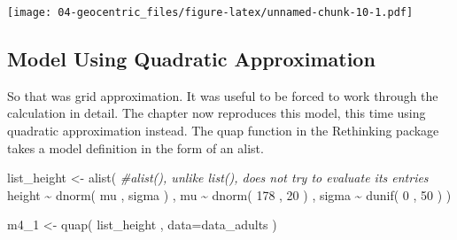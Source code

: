 \documentclass[
]{book}
\newenvironment{Shaded}{\begin{snugshade}}{\end{snugshade}}
\newcommand{\AttributeTok}[1]{\textcolor[rgb]{0.77,0.63,0.00}{#1}}
\newcommand{\CommentTok}[1]{\textcolor[rgb]{0.56,0.35,0.01}{\textit{#1}}}
\newcommand{\ConstantTok}[1]{\textcolor[rgb]{0.00,0.00,0.00}{#1}}
\newcommand{\DecValTok}[1]{\textcolor[rgb]{0.00,0.00,0.81}{#1}}
\newcommand{\FloatTok}[1]{\textcolor[rgb]{0.00,0.00,0.81}{#1}}
\newcommand{\FunctionTok}[1]{\textcolor[rgb]{0.00,0.00,0.00}{#1}}
\newcommand{\NormalTok}[1]{#1}
\newcommand{\OtherTok}[1]{\textcolor[rgb]{0.56,0.35,0.01}{#1}}
\newcommand{\SpecialCharTok}[1]{\textcolor[rgb]{0.00,0.00,0.00}{#1}}
\newcommand{\StringTok}[1]{\textcolor[rgb]{0.31,0.60,0.02}{#1}}
\begin{document}
\begin{Shaded}
\end{Shaded}

\texttt{[image: 04-geocentric\_files/figure-latex/unnamed-chunk-10-1.pdf]}

\hypertarget{model-using-quadratic-approximation}{%
\subsection{Model Using Quadratic Approximation}\label{model-using-quadratic-approximation}}

So that was grid approximation. It was useful to be forced to work through the calculation in detail. The chapter now reproduces this model, this time using quadratic approximation instead. The quap function in the Rethinking package takes a model definition in the form of an alist.

\begin{Shaded}
\begin{Highlighting}[]
\NormalTok{list\_height }\OtherTok{\textless{}{-}} \FunctionTok{alist}\NormalTok{( }\CommentTok{\#alist(), unlike list(), does not try to evaluate its entries}
\NormalTok{  height }\SpecialCharTok{\textasciitilde{}} \FunctionTok{dnorm}\NormalTok{( mu , sigma ) , }
\NormalTok{  mu }\SpecialCharTok{\textasciitilde{}} \FunctionTok{dnorm}\NormalTok{( }\DecValTok{178}\NormalTok{ , }\DecValTok{20}\NormalTok{ ) , }
\NormalTok{  sigma }\SpecialCharTok{\textasciitilde{}} \FunctionTok{dunif}\NormalTok{( }\DecValTok{0}\NormalTok{ , }\DecValTok{50}\NormalTok{ )}
\NormalTok{)}

\NormalTok{m4\_1 }\OtherTok{\textless{}{-}} \FunctionTok{quap}\NormalTok{( list\_height , }\AttributeTok{data=}\NormalTok{data\_adults )}
\end{Highlighting}
\end{Shaded}
\end{document}
